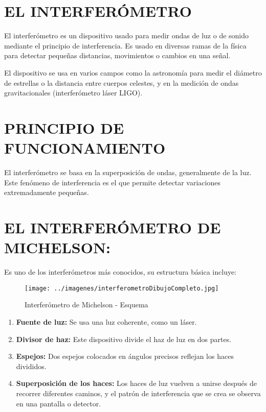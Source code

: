\documentclass[a4paper]{article}
\begin{document}
		
		\section{EL INTERFERÓMETRO}
		
		\indent El interferómetro es un dispositivo usado para medir ondas de luz o de sonido mediante el principio de interferencia. Es usado en diversas ramas de la física para detectar pequeñas distancias, movimientos o cambios en una señal.
		
		\indent El dispositivo se usa en varios campos como la astronomía para medir el diámetro de estrellas o la distancia entre cuerpos celestes, y en la medición de ondas gravitacionales (interferómetro láser LIGO).
		
		\section {PRINCIPIO DE FUNCIONAMIENTO}
		
		\indent El interferómetro se basa en la superposición de ondas, generalmente de la luz. Este fenómeno de interferencia es el que permite detectar variaciones extremadamente pequeñas.
		
		\section{EL INTERFERÓMETRO DE MICHELSON:}
		
		\indent Es uno de los interferómetros más conocidos, su estructura básica incluye: 
		
		\begin{figure}[h!]
			\centering
			\texttt{[image: ../imagenes/interferometroDibujoCompleto.jpg]}
			\caption{Interferómetro de Michelson - Esquema}
			\label{fig:interferometro2}
		\end{figure}
		
		\begin{enumerate}
			\item \textbf{Fuente de luz:} Se usa una luz coherente, como un láser.
			\item \textbf{Divisor de haz:} Este dispositivo divide el haz de luz en dos partes.
			\item \textbf{Espejos:} Dos espejos colocados en ángulos precisos reflejan los haces divididos.
			\item \textbf{Superposición de los haces:} Los haces de luz vuelven a unirse después de recorrer diferentes caminos, y el patrón de interferencia que se crea se observa en una pantalla o detector.
		\end{enumerate}
		
\end{document}
